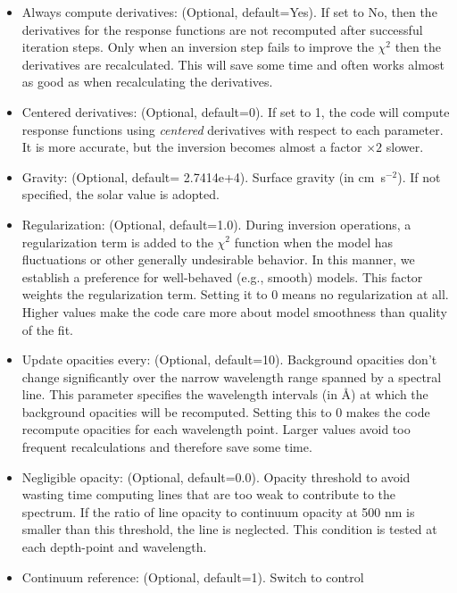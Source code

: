 \begin{itemize}
\item Always compute derivatives: (Optional, default=Yes). If set to
  No, then the derivatives for the response functions are not
  recomputed after successful iteration steps. Only when an inversion
  step fails to improve the $\chi^2$ then the derivatives are
  recalculated. This will save some time and often works almost as
  good as when recalculating the derivatives.
\item Centered derivatives: (Optional, default=0). If set to 1, the
  code will compute response functions using \emph{centered}
  derivatives with respect to each parameter. It is more accurate, but
  the inversion becomes almost a factor $\times2$ slower. 
\item Gravity: (Optional, default= 2.7414e+4). Surface gravity (in
  cm~s$^{-2}$). If not specified, the solar value is adopted.
\item Regularization: (Optional, default=1.0). During inversion
  operations, a regularization term is added to the $\chi^2$ function
  when the model has fluctuations or other generally undesirable
  behavior. In this manner, we establish a preference for well-behaved
  (e.g., smooth) models. This factor weights the regularization
  term. Setting it to 0 means no regularization at all. Higher values
  make the code care more about model smoothness than quality of the
  fit.
\item Update opacities every: (Optional, default=10). Background
  opacities don't change significantly over the narrow wavelength
  range spanned by a spectral line. This parameter specifies the
  wavelength intervals (in \AA ) at which the background opacities
  will be recomputed. Setting this to 0 makes the code recompute
  opacities for each wavelength point. Larger values avoid too
  frequent recalculations and therefore save some time.
\item Negligible opacity: (Optional, default=0.0). Opacity threshold
  to avoid wasting time computing lines that are too weak to
  contribute to the spectrum. If the ratio of line opacity to
  continuum opacity at 500 nm is smaller than this threshold, the line
  is neglected. This condition is tested at each depth-point and wavelength.
\item Continuum reference: (Optional, default=1). Switch to control

\end{itemize}
